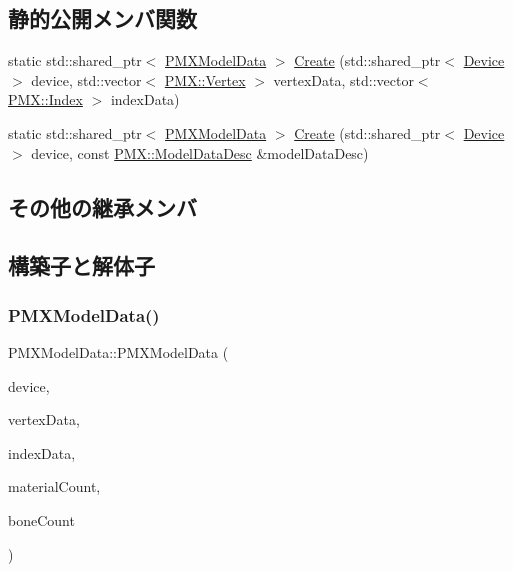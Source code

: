 \subsection*{静的公開メンバ関数}
\begin{DoxyCompactItemize}
\item 
static std\+::shared\+\_\+ptr$<$ \mbox{\hyperlink{class_p_m_x_model_data}{P\+M\+X\+Model\+Data}} $>$ \mbox{\hyperlink{class_p_m_x_model_data_a86aa963671719340a27fc76f88268dac}{Create}} (std\+::shared\+\_\+ptr$<$ \mbox{\hyperlink{class_device}{Device}} $>$ device, std\+::vector$<$ \mbox{\hyperlink{struct_p_m_x_1_1_vertex}{P\+M\+X\+::\+Vertex}} $>$ vertex\+Data, std\+::vector$<$ \mbox{\hyperlink{struct_p_m_x_1_1_index}{P\+M\+X\+::\+Index}} $>$ index\+Data)
\item 
static std\+::shared\+\_\+ptr$<$ \mbox{\hyperlink{class_p_m_x_model_data}{P\+M\+X\+Model\+Data}} $>$ \mbox{\hyperlink{class_p_m_x_model_data_ad65a359bdb1bd0e82225bee2c4158036}{Create}} (std\+::shared\+\_\+ptr$<$ \mbox{\hyperlink{class_device}{Device}} $>$ device, const \mbox{\hyperlink{struct_p_m_x_1_1_model_data_desc}{P\+M\+X\+::\+Model\+Data\+Desc}} \&model\+Data\+Desc)
\end{DoxyCompactItemize}
\subsection*{その他の継承メンバ}


\subsection{構築子と解体子}
\mbox{\label{class_p_m_x_model_data_a9865c076685f2efab59e2f19b12e86b5}} 
\subsubsection{\texorpdfstring{P\+M\+X\+Model\+Data()}{PMXModelData()}}
{\footnotesize\ttfamily P\+M\+X\+Model\+Data\+::\+P\+M\+X\+Model\+Data (\begin{DoxyParamCaption}\item[{std\+::shared\+\_\+ptr$<$ \mbox{\hyperlink{class_device}{Device}} $>$}]{device,  }\item[{std\+::vector$<$ \mbox{\hyperlink{struct_p_m_x_1_1_vertex}{P\+M\+X\+::\+Vertex}} $>$}]{vertex\+Data,  }\item[{std\+::vector$<$ \mbox{\hyperlink{struct_p_m_x_1_1_index}{P\+M\+X\+::\+Index}} $>$}]{index\+Data,  }\item[{int}]{material\+Count,  }\item[{int}]{bone\+Count }\end{DoxyParamCaption})}

